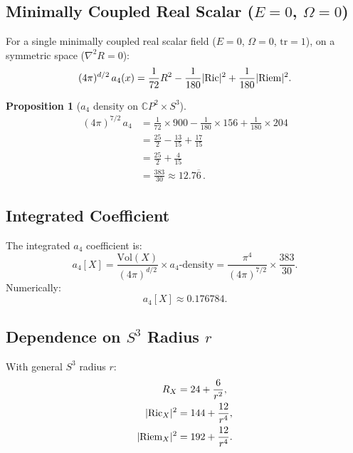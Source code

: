 \documentclass[11pt,a4paper]{article}
\newtheorem{proposition}{Proposition}
\begin{document}
\subsection{Minimally Coupled Real Scalar ($E = 0$, $\Omega = 0$)}

For a single minimally coupled real scalar field ($E = 0$, $\Omega = 0$,
$\mathrm{tr} = 1$), on a symmetric space ($\nabla^2 R = 0$):
\begin{equation}\label{eq:a4-minimal}
(4\pi)^{d/2}\,a_4(x) = \frac{1}{72}R^2
  - \frac{1}{180}|{\rm Ric}|^2
  + \frac{1}{180}|{\rm Riem}|^2.
\end{equation}

\begin{proposition}[$a_4$ density on $\mathbb{C}P^2 \times S^3$]
\begin{align}
(4\pi)^{7/2}\,a_4 &= \frac{1}{72}\times 900
  - \frac{1}{180}\times 156
  + \frac{1}{180}\times 204 \nonumber\\
&= \frac{25}{2} - \frac{13}{15} + \frac{17}{15} \nonumber\\
&= \frac{25}{2} + \frac{4}{15} \nonumber\\
&= \boxed{\frac{383}{30} \approx 12.7\overline{6}}\,.
\end{align}
\end{proposition}

\subsection{Integrated Coefficient}

The integrated $a_4$ coefficient is:
\begin{equation}
a_4[X] = \frac{\mathrm{Vol}(X)}{(4\pi)^{d/2}} \times a_4\text{-density}
= \frac{\pi^4}{(4\pi)^{7/2}} \times \frac{383}{30}.
\end{equation}
Numerically:
\begin{equation}
a_4[X] \approx 0.176784.
\end{equation}

\subsection{Dependence on $S^3$ Radius $r$}

With general $S^3$ radius $r$:
\begin{align}
R_X &= 24 + \frac{6}{r^2}, \\
|{\rm Ric}_X|^2 &= 144 + \frac{12}{r^4}, \\
|{\rm Riem}_X|^2 &= 192 + \frac{12}{r^4}.
\end{align}
\end{document}
